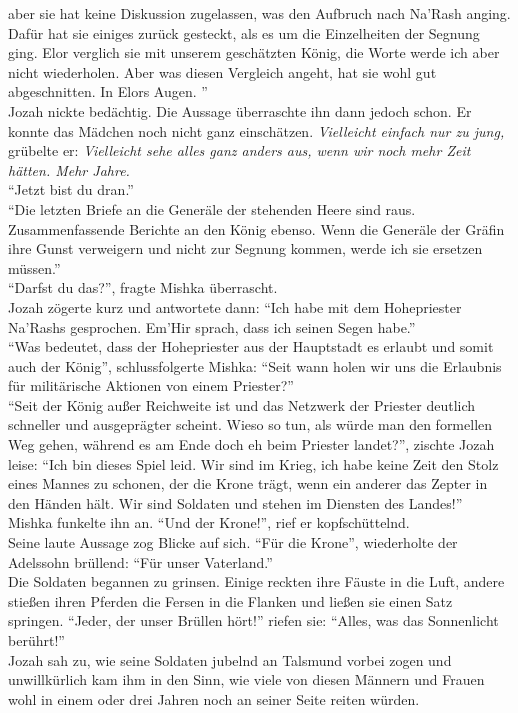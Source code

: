 aber sie hat keine Diskussion zugelassen, was den Aufbruch nach Na'Rash anging. Dafür hat sie 
einiges zurück gesteckt, als es um die Einzelheiten der Segnung ging. Elor verglich sie mit unserem 
geschätzten König, die Worte werde ich aber nicht wiederholen. Aber was diesen Vergleich angeht, 
hat sie wohl gut abgeschnitten. In Elors Augen. ''\\
Jozah nickte bedächtig. Die Aussage überraschte ihn dann jedoch schon. Er konnte das Mädchen noch 
nicht ganz einschätzen. \textit{Vielleicht einfach nur zu jung,} grübelte er: \textit{Vielleicht 
sehe alles ganz anders aus, wenn wir noch mehr Zeit hätten. Mehr Jahre.}\\
``Jetzt bist du dran.''\\
``Die letzten Briefe an die Generäle der stehenden Heere sind raus. Zusammenfassende Berichte an 
den König ebenso. Wenn die Generäle der Gräfin ihre Gunst verweigern und nicht zur Segnung kommen, 
werde ich sie ersetzen müssen.''\\
``Darfst du das?'', fragte Mishka überrascht.\\
Jozah zögerte kurz und antwortete dann: ``Ich habe mit dem Hohepriester Na'Rashs gesprochen. Em'Hir 
sprach, dass ich seinen Segen habe.''\\
``Was bedeutet, dass der Hohepriester aus der Hauptstadt es erlaubt und somit auch der König'', 
schlussfolgerte Mishka: ``Seit wann holen wir uns die Erlaubnis für militärische Aktionen von einem 
Priester?''\\
``Seit der König außer Reichweite ist und das Netzwerk der Priester deutlich schneller und 
ausgeprägter scheint. Wieso so tun, als würde man den formellen Weg gehen, während es am Ende doch 
eh beim Priester landet?'', zischte Jozah leise: ``Ich bin dieses Spiel leid. Wir sind im Krieg, 
ich habe keine Zeit den Stolz eines Mannes zu schonen, der die Krone trägt, wenn ein anderer das 
Zepter in den Händen hält. Wir sind Soldaten und stehen im Diensten des Landes!''\\
Mishka funkelte ihn an. ``Und der Krone!'', rief er kopfschüttelnd.\\
Seine laute Aussage zog Blicke auf sich. ``Für die Krone'', wiederholte der Adelssohn brüllend: 
``Für unser Vaterland.''\\
Die Soldaten begannen zu grinsen. Einige reckten ihre Fäuste in die Luft, andere stießen ihren 
Pferden die Fersen in die Flanken und ließen sie einen Satz springen. ``Jeder, der 
unser Brüllen hört!'' riefen sie: ``Alles, was das Sonnenlicht berührt!''\\
Jozah sah zu, wie seine Soldaten jubelnd an Talsmund vorbei zogen und unwillkürlich kam ihm in den 
Sinn, wie viele von diesen Männern und Frauen wohl in einem oder drei Jahren noch an seiner Seite 
reiten würden.\\


